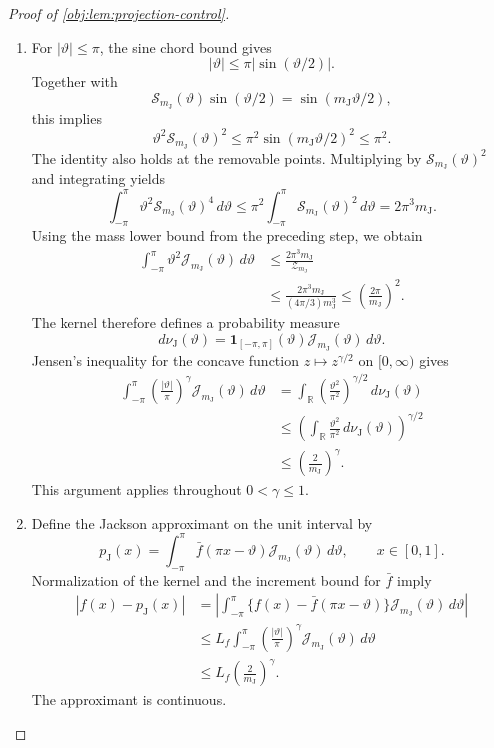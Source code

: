 \begin{proof}[Proof of \cref{obj:lem:projection-control}]
\begin{enumerate}
\item For \(|\vartheta|\le\pi\), the sine chord bound gives
\[
|\vartheta|\le\pi|\sin(\vartheta/2)|.
\]
Together with
\[
\mathcal S_{m_{\mathrm J}}(\vartheta)\sin(\vartheta/2)
=\sin(m_{\mathrm J}\vartheta/2),
\]
this implies
\[
\vartheta^2\mathcal S_{m_{\mathrm J}}(\vartheta)^2
\le\pi^2\sin(m_{\mathrm J}\vartheta/2)^2
\le\pi^2.
\]
The identity also holds at the removable points. Multiplying by
\(\mathcal S_{m_{\mathrm J}}(\vartheta)^2\) and integrating yields
\[
\int_{-\pi}^{\pi}
 \vartheta^2\mathcal S_{m_{\mathrm J}}(\vartheta)^4\,d\vartheta
\le
\pi^2\int_{-\pi}^{\pi}
 \mathcal S_{m_{\mathrm J}}(\vartheta)^2\,d\vartheta
=2\pi^3m_{\mathrm J}.
\]
Using the mass lower bound from the preceding step, we obtain
\[
\begin{aligned}
\int_{-\pi}^{\pi}\vartheta^2\mathcal J_{m_{\mathrm J}}(\vartheta)\,d\vartheta
&\le \frac{2\pi^3m_{\mathrm J}}{\mathcal Z_{m_{\mathrm J}}}\\
&\le \frac{2\pi^3m_{\mathrm J}}
              {(4\pi/3)m_{\mathrm J}^3}
\le \left(\frac{2\pi}{m_{\mathrm J}}\right)^2.
\end{aligned}
\]
The kernel therefore defines a probability measure
\[
d\nu_{\mathrm J}(\vartheta)
=\mathbf 1_{[-\pi,\pi]}(\vartheta)
 \mathcal J_{m_{\mathrm J}}(\vartheta)\,d\vartheta.
\]
Jensen's inequality for the concave function \(z\mapsto z^{\gamma/2}\) on \([0,\infty)\) gives
\[
\begin{aligned}
\int_{-\pi}^{\pi}
 \left(\frac{|\vartheta|}{\pi}\right)^\gamma
 \mathcal J_{m_{\mathrm J}}(\vartheta)\,d\vartheta
&=
\int_{\mathbb R}
 \left(\frac{\vartheta^2}{\pi^2}\right)^{\gamma/2}
 \,d\nu_{\mathrm J}(\vartheta)\\
&\le
\left(\int_{\mathbb R}\frac{\vartheta^2}{\pi^2}
 \,d\nu_{\mathrm J}(\vartheta)\right)^{\gamma/2}\\
&\le\left(\frac{2}{m_{\mathrm J}}\right)^\gamma.
\end{aligned}
\]
This argument applies throughout \(0<\gamma\le1\).

\item Define the Jackson approximant on the unit interval by
\[
p_{\mathrm J}(x)
=\int_{-\pi}^{\pi}
 \bar f(\pi x-\vartheta)\mathcal J_{m_{\mathrm J}}(\vartheta)\,d\vartheta,
\qquad x\in[0,1].
\]
Normalization of the kernel and the increment bound for \(\bar f\) imply
\[
\begin{aligned}
|f(x)-p_{\mathrm J}(x)|
&=\left|\int_{-\pi}^{\pi}
  \{f(x)-\bar f(\pi x-\vartheta)\}
  \mathcal J_{m_{\mathrm J}}(\vartheta)\,d\vartheta\right|\\
&\le L_f\int_{-\pi}^{\pi}
 \left(\frac{|\vartheta|}{\pi}\right)^\gamma
 \mathcal J_{m_{\mathrm J}}(\vartheta)\,d\vartheta\\
&\le L_f\left(\frac{2}{m_{\mathrm J}}\right)^\gamma.
\end{aligned}
\]
The approximant is continuous.


\end{enumerate}
\end{proof}
